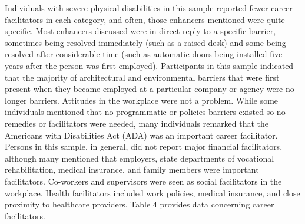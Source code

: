 \documentclass[11.5pt]{sig-alternate} %
\begin{document}
\begin{large}
Individuals with severe physical disabilities in this sample reported fewer career facilitators in each category, and often, those enhancers mentioned were quite specific. Most enhancers discussed were in direct reply to a specific barrier, sometimes being resolved immediately (such as a raised desk) and some being resolved after considerable time (such as automatic doors being installed five years after the person was first employed). Participants in this sample indicated that the majority of architectural and environmental barriers that were first present when they became employed at a particular company or agency were no longer barriers. Attitudes in the workplace were not a problem. While some individuals mentioned that no programmatic or policies barriers existed so no remedies or facilitators were needed, many individuals remarked that the Americans with Disabilities Act (ADA) was an important career facilitator. Persons in this sample, in general, did not report major financial facilitators, although many mentioned that employers, state departments of vocational rehabilitation, medical insurance, and family members were important facilitators. Co-workers and supervisors were seen as social facilitators in the workplace. Health facilitators included work policies, medical insurance, and close proximity to healthcare providers. Table 4 provides data concerning career facilitators.



\end{large}
\end{document}
